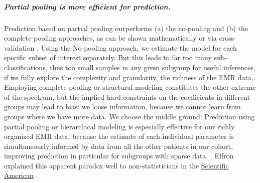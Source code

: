 \documentclass[11pt,notitlepage]{article}
\begin{document}
\subparagraph*{Partial pooling is more efficient for prediction.}
Prediction based on partial pooling outperforms (a) the no-pooling and (b) the complete-pooling approaches, as can be shown mathematically \cite{Efron_1975} or via cross-validation \cite{Gelman-Hill_2014}.  Using the No-pooling approach, we estimate the model for each specific subset of interest separately. But this leads to far too many sub-classifications, thus too small samples in any given subgroup for useful inferences, if we fully explore the complexity and granularity, the richness of the EMR data,. Employing complete pooling or structural modeling constitutes the other extreme of the spectrum, but the implied hard constraints on the coefficients in different groups may lead to bias: we loose information, because we cannot learn from groups where we have more data. We choose the middle ground: Prediction using partial pooling or hierarchical modeling is especially effective for our richly organized EMR data, because the estimate of each individual parameter is simultaneously informed by data from all the other patients in our cohort, improving prediction in particular for subgroups with sparse data. \cite{Gelman_multilevel_2006}. Effron explained this apparent paradox well to non-statisticians in the \href{http://www.nature.com/scientificamerican/journal/v236/n5/pdf/scientificamerican0577-119.pdf}{Scientific American} \cite{Stein_paradox_Scientific_American,Efron_Stein_1977}. 
\end{document}
